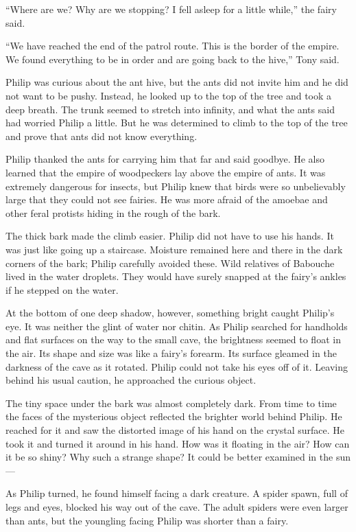 \documentclass[10pt, draft]{memoir}
\begin{document}
``Where are we? Why are we stopping? I fell asleep for a little while,'' the
fairy said.

``We have reached the end of the patrol route. This is the border of the
empire. We found everything to be in order and are going back to the hive,''
Tony said.

Philip was curious about the ant hive, but the ants did not invite him and he
did not want to be pushy. Instead, he looked up to the top of the tree and took
a deep breath. The trunk seemed to stretch into infinity, and what the ants
said had worried Philip a little. But he was determined to climb to the top of
the tree and prove that ants did not know everything.

Philip thanked the ants for carrying him that far and said goodbye. He also
learned that the empire of woodpeckers lay above the empire of ants. It was
extremely dangerous for insects, but Philip knew that birds were so
unbelievably large that they could not see fairies. He was more afraid of the
amoebae and other feral protists hiding in the rough of the bark.

The thick bark made the climb easier. Philip did not have to use his hands. It
was just like going up a staircase. Moisture remained here and there in the
dark corners of the bark; Philip carefully avoided these. Wild relatives of
Babouche lived in the water droplets. They would have surely snapped at the
fairy's ankles if he stepped on the water.

At the bottom of one deep shadow, however, something bright caught Philip's
eye. It was neither the glint of water nor chitin. As Philip searched for
handholds and flat surfaces on the way to the small cave, the brightness seemed
to float in the air. Its shape and size was like a fairy's forearm. Its surface
gleamed in the darkness of the cave as it rotated. Philip could not take his
eyes off of it. Leaving behind his usual caution, he approached the curious
object.

The tiny space under the bark was almost completely dark. From time to time the
faces of the mysterious object reflected the brighter world behind Philip. He
reached for it and saw the distorted image of his hand on the crystal surface.
He took it and turned it around in his hand. How was it floating in the air?
How can it be so shiny? Why such a strange shape? It could be better examined
in the sun---

As Philip turned, he found himself facing a dark creature. A spider spawn, full
of legs and eyes, blocked his way out of the cave. The adult spiders were even
larger than ants, but the youngling facing Philip was shorter than a fairy.
\end{document}
